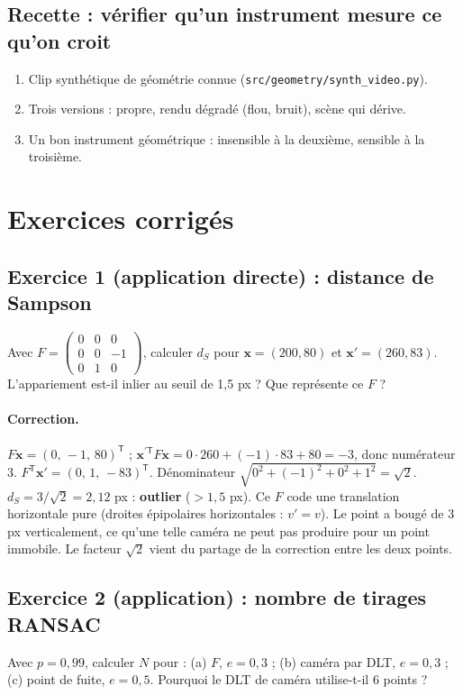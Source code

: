 \documentclass[11pt,a4paper]{article}
\newcommand{\T}{^{\mathsf T}}
\newcommand{\x}{\mathbf{x}}
\begin{document}
\subsection{Recette : vérifier qu'un instrument mesure ce qu'on croit}
\begin{enumerate}
  \item Clip synthétique de géométrie connue (\texttt{src/geometry/synth\_video.py}).
  \item Trois versions : propre, rendu dégradé (flou, bruit), scène qui dérive.
  \item Un bon instrument géométrique : insensible à la deuxième, sensible à la troisième.
\end{enumerate}

\section{Exercices corrigés}

\subsection*{Exercice 1 (application directe) : distance de Sampson}
Avec $F=\begin{pmatrix}0&0&0\\0&0&-1\\0&1&0\end{pmatrix}$, calculer $d_S$ pour $\x=(200,80)$ et
$\x'=(260,83)$. L'appariement est-il inlier au seuil de 1,5 px ? Que représente ce $F$ ?

\paragraph{Correction.}
$F\x=(0,\,-1,\,80)\T$ ; $\x^{\prime\mathsf{T}} F\x=0\cdot260+(-1)\cdot83+80=-3$, donc numérateur 3.
$F\T\x'=(0,\,1,\,-83)\T$. Dénominateur $\sqrt{0^2+(-1)^2+0^2+1^2}=\sqrt2$.
$d_S=3/\sqrt2=2{,}12$ px : \textbf{outlier} ($>1{,}5$ px). Ce $F$ code une translation horizontale
pure (droites épipolaires horizontales : $v'=v$). Le point a bougé de 3 px verticalement, ce qu'une
telle caméra ne peut pas produire pour un point immobile. Le facteur $\sqrt2$ vient du partage de
la correction entre les deux points.

\subsection*{Exercice 2 (application) : nombre de tirages RANSAC}
Avec $p=0{,}99$, calculer $N$ pour : (a) $F$, $e=0{,}3$ ; (b) caméra par DLT, $e=0{,}3$ ; (c) point
de fuite, $e=0{,}5$. Pourquoi le DLT de caméra utilise-t-il 6 points ?
\end{document}
